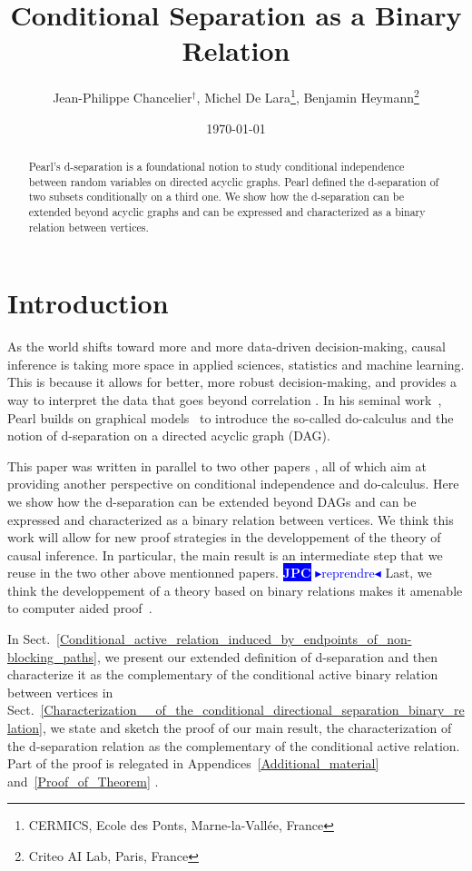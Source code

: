 \documentclass[12pt]{article}
\title{Conditional Separation as a Binary Relation}%
\author{%
  Jean-Philippe Chancelier$^\dagger$,
  Michel De Lara\footnote{CERMICS, Ecole des Ponts, Marne-la-Vall\'ee, France},
  Benjamin Heymann\footnote{Criteo AI Lab, Paris, France}
}
\date{\today}
\def\citep#1{\cite{#1}}
\newif\ifpreprint
\newcommand{\nb}[3]{
		{\colorbox{#2}{\bfseries\sffamily\tiny\textcolor{white}{#1}}}
		{\textcolor{#2}{$\blacktriangleright${#3}$\blacktriangleleft$}}}
\newcommand{\jpc}[1]{\nb{JPC}{blue}{#1}}
\begin{document}
\maketitle

\begin{abstract}
  Pearl's d-separation is a foundational notion to study conditional
  independence between random variables on directed acyclic graphs.
  Pearl defined the d-separation of two subsets conditionally on a third one.
  We show how the d-separation can be extended beyond acyclic graphs
  and can be expressed and characterized as a binary relation between vertices. 
\end{abstract}

\setcounter{tocdepth}{2}
\pagebreak\tableofcontents \pagebreak 

\section{Introduction}
As the world shifts toward more and more data-driven decision-making, causal
inference is taking more space in applied sciences, statistics and machine
learning.  This is because it allows for better, more robust decision-making,
and provides a way to interpret the data that goes beyond correlation
\citep{pearl2018book}.  In his seminal work~\citep{pearl1995causal}, Pearl
builds on graphical models~\citep{cowell2006probabilistic} to introduce the
so-called do-calculus and the notion of d-separation on a directed acyclic graph
(DAG).

This paper was written in parallel to two other papers
\citep{De-Lara-Chancelier-Heymann-2021,Heymann-De-Lara-Chancelier-2021}, all of
which aim at providing another perspective on conditional independence and
do-calculus.  Here we show how the d-separation can be extended beyond DAGs and
can be expressed and characterized as a binary relation between vertices.  We
think this work will allow for new proof strategies in the developpement of the
theory of causal inference.  In particular, the main result is an intermediate
step that we reuse in the two other above mentionned papers. \jpc{reprendre}
Last, we think the
developpement of a theory based on binary relations makes it amenable to
computer aided proof~\citep{pous2013}. %

In Sect.~\ref{Conditional_active_relation_induced_by_endpoints_of_non-blocking_paths},
we present our extended definition of d-separation and then characterize it as
the complementary of the conditional active binary relation between vertices in
Sect.~\ref{Characterization__of_the_conditional_directional_separation_binary_relation},
we state and sketch the proof of our main result, the characterization of the
d-separation relation as the complementary of the conditional active relation.
Part of the proof is relegated in Appendices~\ref{Additional_material}
and~\ref{Proof_of_Theorem}%
\ifpreprint , as well as a treatment of the moral
  relation~\citep{Lauritzen-et-al-1990} with binary relations in
  Appendices~\ref{Moral_relation}.  \else .  \fi
\end{document}

